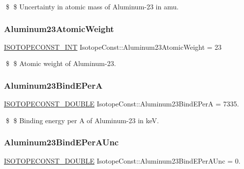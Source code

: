 \$ \$ Uncertainty in atomic mass of Aluminum-\/23 in amu. \mbox{\label{group___isotope_const-_aluminum-_al23_ga76bbe563623847700d7d27ba036a6382}} 
\subsubsection{\texorpdfstring{Aluminum23\+Atomic\+Weight}{Aluminum23AtomicWeight}}
{\footnotesize\ttfamily \mbox{\hyperlink{group___isotope_const-_macros_ga5f18360b3e99483a35c32d789e62621c}{I\+S\+O\+T\+O\+P\+E\+C\+O\+N\+S\+T\+\_\+\+I\+NT}} Isotope\+Const\+::\+Aluminum23\+Atomic\+Weight = 23}

\$ \$ Atomic weight of Aluminum-\/23. \mbox{\label{group___isotope_const-_aluminum-_al23_ga10e8fc6a207ac91f41cd704b2e383d3e}} 
\subsubsection{\texorpdfstring{Aluminum23\+Bind\+E\+PerA}{Aluminum23BindEPerA}}
{\footnotesize\ttfamily \mbox{\hyperlink{group___isotope_const-_macros_ga8f45a7272ce02c0b4c65c44636ed719a}{I\+S\+O\+T\+O\+P\+E\+C\+O\+N\+S\+T\+\_\+\+D\+O\+U\+B\+LE}} Isotope\+Const\+::\+Aluminum23\+Bind\+E\+PerA = 7335.}

\$ \$ Binding energy per A of Aluminum-\/23 in keV. \mbox{\label{group___isotope_const-_aluminum-_al23_gae96bcf5436821b5751decc85ef01f79b}} 
\subsubsection{\texorpdfstring{Aluminum23\+Bind\+E\+Per\+A\+Unc}{Aluminum23BindEPerAUnc}}
{\footnotesize\ttfamily \mbox{\hyperlink{group___isotope_const-_macros_ga8f45a7272ce02c0b4c65c44636ed719a}{I\+S\+O\+T\+O\+P\+E\+C\+O\+N\+S\+T\+\_\+\+D\+O\+U\+B\+LE}} Isotope\+Const\+::\+Aluminum23\+Bind\+E\+Per\+A\+Unc = 0.}

